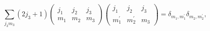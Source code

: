 \[\sum_{j_{3}m_{3}}(2j_{3}+1)\begin{pmatrix}j_{1}&j_{2}&j_{3}\\
m_{1}&m_{2}&m_{3}\end{pmatrix}\begin{pmatrix}j_{1}&j_{2}&j_{3}\\
m^{\prime}_{1}&m^{\prime}_{2}&m_{3}\end{pmatrix}=\delta_{m_{1},m^{\prime}_{1}}%
\delta_{m_{2},m^{\prime}_{2}},\]